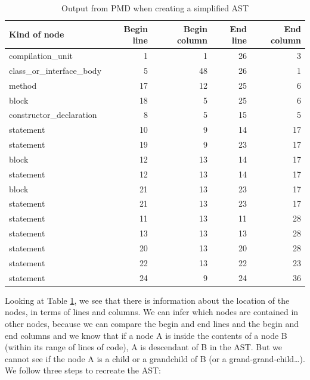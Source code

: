 \documentclass[
]{article}
\begin{document}
\begin{table}[!h]

\caption{\label{tab:unnamed-chunk-2}Output from PMD when creating a simplified AST\label{tab_nodes}}
\centering
\begin{tabular}[t]{l|r|r|r|r}
\hline
Kind of node & Begin line & Begin column & End line & End column\\
\hline
\rowcolor{gray!6}  compilation\_unit & 1 & 1 & 26 & 3\\
\hline
class\_or\_interface\_body & 5 & 48 & 26 & 1\\
\hline
\rowcolor{gray!6}  method & 17 & 12 & 25 & 6\\
\hline
block & 18 & 5 & 25 & 6\\
\hline
\rowcolor{gray!6}  constructor\_declaration & 8 & 5 & 15 & 5\\
\hline
statement & 10 & 9 & 14 & 17\\
\hline
\rowcolor{gray!6}  statement & 19 & 9 & 23 & 17\\
\hline
block & 12 & 13 & 14 & 17\\
\hline
\rowcolor{gray!6}  statement & 12 & 13 & 14 & 17\\
\hline
block & 21 & 13 & 23 & 17\\
\hline
\rowcolor{gray!6}  statement & 21 & 13 & 23 & 17\\
\hline
statement & 11 & 13 & 11 & 28\\
\hline
\rowcolor{gray!6}  statement & 13 & 13 & 13 & 28\\
\hline
statement & 20 & 13 & 20 & 28\\
\hline
\rowcolor{gray!6}  statement & 22 & 13 & 22 & 23\\
\hline
statement & 24 & 9 & 24 & 36\\
\hline
\end{tabular}
\end{table}

\normalsize

%
%
%
%

Looking at Table \ref{tab_nodes}, we see that there is information about
the location of the nodes, in terms of lines and columns. We can infer
which nodes are contained in other nodes, because we can compare the 
begin and end lines and the begin and end columns and we know that if
a node A is inside the contents of a node B (within its range of lines of code), 
A is descendant of B in the AST. But we cannot see if the node A is a
child or a grandchild of B (or a grand-grand-child\ldots). We follow 
three steps to recreate the AST:
\end{document}
